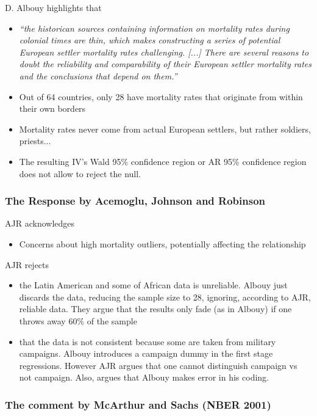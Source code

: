 \documentclass[12pt, final]{article}
\begin{document}
D. Albouy highlights that
\begin{itemize}
	\item \textit{``the historican sources containing information on mortality rates during colonial times are thin, which makes constructing a series of potential European settler mortality rates challenging. [...] There are several reasons to doubt the reliability and comparability of their European settler mortality rates and the conclusions that depend on them.''}
	\item Out of 64 countries, only 28 have mortality rates that originate from within their own borders
	\item Mortality rates never come from actual European settlers, but rather soldiers, priests...
	\item The resulting IV's Wald 95\% confidence region or AR 95\% confidence region does not allow to reject the null.
\end{itemize}

\subsubsection*{The Response by Acemoglu, Johnson and Robinson} %

AJR acknowledges
\begin{itemize}
	\item Concerns about high mortality outliers, potentially affecting the relationship
\end{itemize}
AJR rejects
\begin{itemize}
	\item the Latin American and some of African data is unreliable. Albouy just discards the data, reducing the sample size to 28, ignoring, according to AJR, reliable data. They argue that the results only fade (as in Albouy) if one throws away 60\% of the sample
	\item that the data is not consistent because some are taken from military campaigns. Albouy introduces a campaign dummy in the first stage regressions. However AJR argues that one cannot distinguish campaign vs not campaign. Also, argues that Albouy makes error in his coding.
\end{itemize}

\subsubsection*{The comment by McArthur and Sachs (NBER 2001)} %
\end{document}
